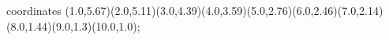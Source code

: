 					coordinates { (1.0,5.67)(2.0,5.11)(3.0,4.39)(4.0,3.59)(5.0,2.76)(6.0,2.46)(7.0,2.14)(8.0,1.44)(9.0,1.3)(10.0,1.0)};